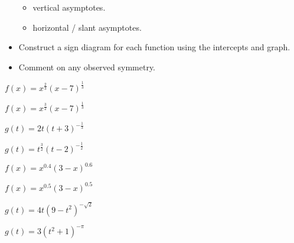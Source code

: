 \documentclass{ximera}
\begin{document}
\begin{itemize}
\begin{multicols}{2}
\begin{itemize}
\item  vertical asymptotes.

\item  horizontal / slant asymptotes.

\end{itemize}

\end{multicols}

\item Construct a sign diagram for each function using the intercepts and graph.

\item  Comment on any observed symmetry.


\end{itemize}



\begin{question} $f(x) = x^{\frac{2}{3}}(x - 7)^{\frac{1}{3}}$
\end{question}
\begin{question} $f(x) = x^{\frac{3}{2}}(x - 7)^{\frac{1}{3}}$  
\end{question}
\begin{question} $g(t) = 2t(t+3)^{-\frac{1}{3}}$  
\end{question}
\begin{question} $g(t) = t^{\frac{3}{2}}(t-2)^{-\frac{1}{2}}$  
\end{question}
\begin{question} $f(x) = x^{0.4} (3-x)^{0.6}$  
\end{question}
\begin{question} $f(x) = x^{0.5} (3-x)^{0.5}$  
\end{question}
\begin{question} $g(t) = 4t (9-t^2)^{-\sqrt{2}}$  
\end{question}
\begin{question} $g(t) = 3(t^2+1)^{-\pi}$
\end{question}
\end{document}
